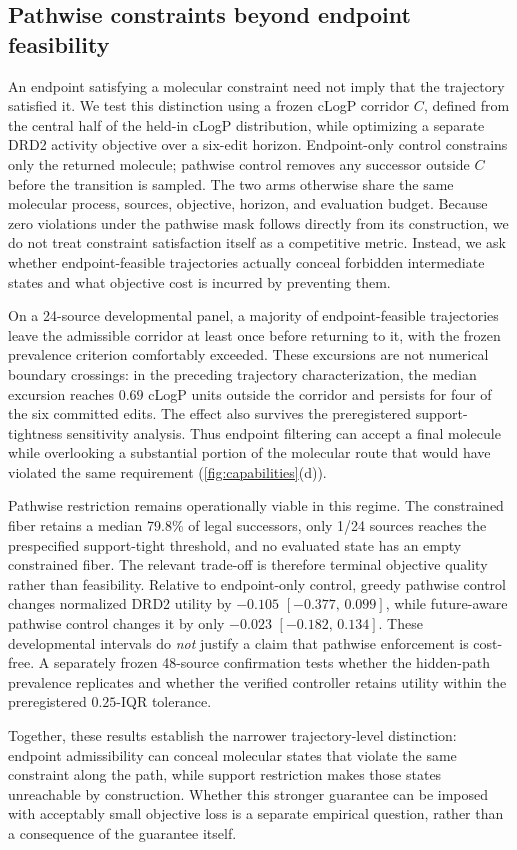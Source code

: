\subsection{Pathwise constraints beyond endpoint feasibility}
\label{sec:exp-pathwise}

An endpoint satisfying a molecular constraint need not imply that the trajectory satisfied it. We test this distinction using a frozen cLogP corridor $C$, defined from the central half of the held-in cLogP distribution, while optimizing a separate DRD2 activity objective over a six-edit horizon. Endpoint-only control constrains only the returned molecule; pathwise control removes any successor outside $C$ before the transition is sampled. The two arms otherwise share the same molecular process, sources, objective, horizon, and evaluation budget. Because zero violations under the pathwise mask follows directly from its construction, we do not treat constraint satisfaction itself as a competitive metric. Instead, we ask whether endpoint-feasible trajectories actually conceal forbidden intermediate states and what objective cost is incurred by preventing them.

On a 24-source developmental panel, a majority of endpoint-feasible trajectories leave the admissible corridor at least once before returning to it, with the frozen prevalence criterion comfortably exceeded. These excursions are not numerical boundary crossings: in the preceding trajectory characterization, the median excursion reaches $0.69$ cLogP units outside the corridor and persists for four of the six committed edits. The effect also survives the preregistered support-tightness sensitivity analysis. Thus endpoint filtering can accept a final molecule while overlooking a substantial portion of the molecular route that would have violated the same requirement (\cref{fig:capabilities}(d)).

Pathwise restriction remains operationally viable in this regime. The constrained fiber retains a median 79.8\% of legal successors, only 1/24 sources reaches the prespecified support-tight threshold, and no evaluated state has an empty constrained fiber. The relevant trade-off is therefore terminal objective quality rather than feasibility. Relative to endpoint-only control, greedy pathwise control changes normalized DRD2 utility by $-0.105$ $[-0.377,\,0.099]$, while future-aware pathwise control changes it by only $-0.023$ $[-0.182,\,0.134]$. These developmental intervals do \emph{not} justify a claim that pathwise enforcement is cost-free. A separately frozen 48-source confirmation tests whether the hidden-path prevalence replicates and whether the verified controller retains utility within the preregistered $0.25$-IQR tolerance.

Together, these results establish the narrower trajectory-level distinction: endpoint admissibility can conceal molecular states that violate the same constraint along the path, while support restriction makes those states unreachable by construction. Whether this stronger guarantee can be imposed with acceptably small objective loss is a separate empirical question, rather than a consequence of the guarantee itself.
